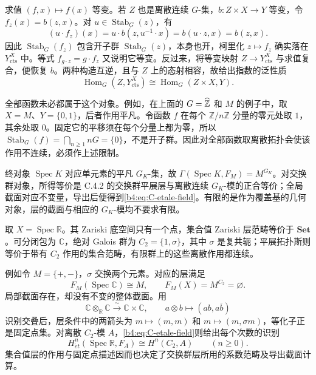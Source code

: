 \ProseParagraphBreak
求值 \((f,x)\mapsto f(x)\) 等变。若 \(Z\) 也是离散连续 \(G\)-集，\(b:Z\times X\to Y\) 等变，令 \(f_z(x)=b(z,x)\)。对 \(u\in\operatorname{Stab}_G(z)\)，有
\[
	(u\cdot f_z)(x)=u\cdot b(z,u^{-1}\cdot x) =b(u\cdot z,x)=b(z,x).
\]
因此 \(\operatorname{Stab}_G(f_z)\) 包含开子群 \(\operatorname{Stab}_G(z)\)，本身也开，柯里化 \(z\mapsto f_z\) 确实落在 \(Y^X_{\mathrm{cts}}\) 中。等式 \(f_{g\cdot z}=g\cdot f_z\) 又说明它等变。反过来，将等变映射 \(Z\to Y^X_{\mathrm{cts}}\) 与求值复合，便恢复 \(b\)。两种构造互逆，且与 \(Z\) 上的态射相容，故给出指数的泛性质
\[
	\operatorname{Hom}_G(Z,Y^X_{\mathrm{cts}}) \cong\operatorname{Hom}_G(Z\times X,Y).
\]

\ProseParagraphBreak
全部函数未必都属于这个对象。例如，在上面的 \(G=\widehat{\vphantom{Z}\mathbb Z}\) 和 \(M\) 的例子中，取 \(X=M\)、\(Y=\{0,1\}\)，后者作用平凡。令函数 \(f\) 在每个 \(\mathbb Z/n\mathbb Z\) 分量的零元处取 \(1\)，其余处取 \(0\)。固定它的平移须在每个分量上都为零，所以 \(\operatorname{Stab}_G(f)=\bigcap_{n\ge1}nG=\{0\}\)，不是开子群。因此对全部函数取离散拓扑会使该作用不连续，必须作上述限制。

\ProseParagraphBreak
终对象 \(\operatorname{Spec}K\) 对应单元素的平凡 \(G_K\)-集，故 \(\Gamma(\operatorname{Spec}K,F_M)=M^{G_K}\)。对交换群对象，所得等价是 C.4.2 的交换群平展层与离散连续 \(G_K\)-模的正合等价；全局截面对应不变量，导出后便得到\eqref{b4:eq:C-etale-field}。有限的是作为覆盖基的几何对象，层的截面与相应的 \(G_K\)-模均不要求有限。

\begin{example}\label{b4:exm:real-etale-topos}
	取 \(X=\operatorname{Spec}\mathbb R\)。其 Zariski 底空间只有一个点，集合值 Zariski 层范畴等价于 \(\mathbf{Set}\)。可分闭包为 \(\mathbb C\)，绝对 Galois 群为 \(C_2=\{1,\sigma\}\)，其中 \(\sigma\) 是复共轭；平展拓扑斯则等价于带有 \(C_2\) 作用的集合范畴，有限群上的这些离散作用都连续。

	例如令 \(M=\{+,-\}\)，\(\sigma\) 交换两个元素。对应的层满足
	\[
		F_M(\operatorname{Spec}\mathbb C)\cong M, \qquad F_M(X)=M^{C_2}=\varnothing.
	\]
	局部截面存在，却没有不变的整体截面。用
	\[
		\mathbb C\otimes_{\mathbb R}\mathbb C\xrightarrow{\sim} \mathbb C\times\mathbb C,\qquad a\otimes b\longmapsto(ab,a\overline b)
	\]
	识别交叠后，层条件中的两箭头为 \(m\mapsto(m,m)\) 和 \(m\mapsto(m,\sigma m)\)，等化子正是固定点集。对离散 \(C_2\)-模 \(A\)，\eqref{b4:eq:C-etale-field}则给出每个次数的识别
	\[
		H^n_{\acute{e}t}(\operatorname{Spec}\mathbb R,F_A) \cong H^n(C_2,A)\qquad(n\ge0).
	\]
	集合值层的作用与固定点描述因而也决定了交换群层所用的系数范畴及导出截面计算。
\end{example}

